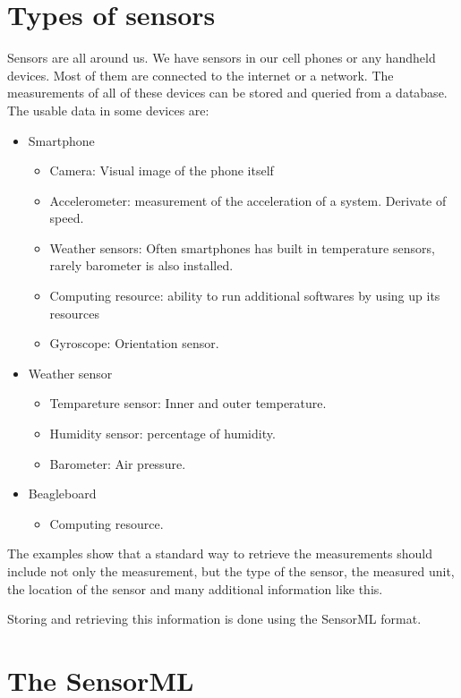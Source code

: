  \section{Types of sensors}
 
 Sensors are all around us. We have sensors in our cell phones or any handheld devices. Most of them are connected to the internet or a network. The measurements of all of these devices can be stored and queried from a database. The usable data in some devices are:
 
 \begin{itemize}
 	\item Smartphone
 	 \begin{itemize}
	 	 \item Camera: Visual image of the phone itself
	 	 \item Accelerometer: measurement of the acceleration of a system. Derivate of speed.
	 	 \item Weather sensors: Often smartphones has built in temperature sensors, rarely barometer is also installed.
	 	 \item Computing resource: ability to run additional softwares by using up its resources
	 	 \item Gyroscope: Orientation sensor.
 	 \end{itemize}
 	 \item Weather sensor
 	 \begin{itemize}
 	 \item Tempareture sensor: Inner and outer temperature.
 	 \item Humidity sensor: percentage of humidity.
 	 \item Barometer: Air pressure.
 	 \end{itemize}
 	 \item Beagleboard
 	 \begin{itemize}
	\item Computing resource.
 	 \end{itemize}
 \end{itemize}

The examples show that a standard way to retrieve the measurements should include not only the measurement, but the type of the sensor, the measured unit, the location of the sensor and many additional information like this. 

Storing and retrieving this information is done using the SensorML format.

\section{The SensorML}

